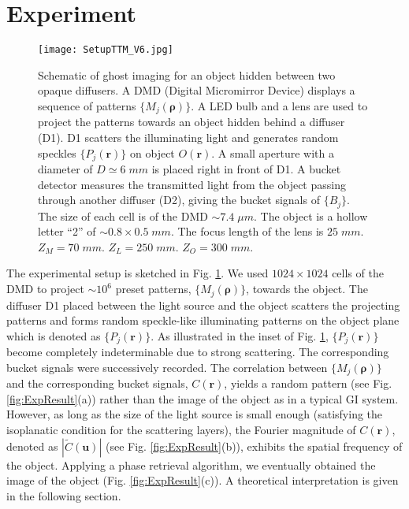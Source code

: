 \documentclass[amsmath,amssymb,aps,prl,groupedaddress,floatfix,12pt]{revtex4-1}
\begin{document}
\section{Experiment}

\begin{figure}[hbt]
    \centering
    \texttt{[image: SetupTTM\_V6.jpg]}    
    \caption{\label{fig:SetupTTM} {Schematic of ghost imaging for an object hidden between two opaque diffusers. 
    A DMD (Digital Micromirror Device) displays a sequence of patterns $\{M_j({\boldsymbol \rho})\}$. A LED bulb and a lens are used to project the patterns towards an object hidden behind a diffuser (D1). D1 scatters the illuminating light and generates random speckles $\{P_j({\boldsymbol r})\}$ on object $O({\boldsymbol r})$. A small aperture with a diameter of $D\simeq 6\;mm$ is placed right in front of D1. A bucket detector measures the transmitted light from the object passing through another diffuser (D2), giving the bucket signals of $\{B_j\}$. The size of each cell is of the DMD $\sim 7.4\;\mu m$. The object is a hollow letter ``2'' of $\sim 0.8\times 0.5\;mm$. The focus length of the lens is $25\;mm$. $Z_M=70\;mm$. $Z_L=250\;mm$. $Z_O=300\;mm$. 
    } }    
\end{figure}


The experimental setup is sketched in Fig. \ref{fig:SetupTTM}.  We used $1024\times 1024$ cells of the DMD to project $\sim 10^6$ preset patterns, $\{M_j({\boldsymbol \rho})\}$, towards the object. The diffuser D1 placed between the light source and the object scatters the projecting patterns and forms random speckle-like illuminating patterns on the object plane which is denoted as $\{P_j({\boldsymbol r})\}$. As illustrated in the inset of Fig. \ref{fig:SetupTTM}, $\{P_j({\boldsymbol r})\}$ become completely indeterminable due to strong scattering. The corresponding bucket signals were successively recorded.  The correlation between $\{M_j({\boldsymbol \rho})\}$ and the corresponding bucket signals, $C({\boldsymbol r})$, yields a random pattern (see Fig. \ref{fig:ExpResult}(a)) rather than the image of the object as in a typical GI system.  However, as long as the size of the light source is small enough (satisfying the isoplanatic condition for the scattering layers), the Fourier magnitude of $C({\boldsymbol r})$,  denoted as $|\tilde{C}({\boldsymbol u})|$ (see Fig. \ref{fig:ExpResult}(b)), exhibits the spatial frequency of the object. Applying a phase retrieval algorithm, we eventually obtained the image of the object (Fig. \ref{fig:ExpResult}(c)).  A theoretical interpretation is given in the following section.
\end{document}
